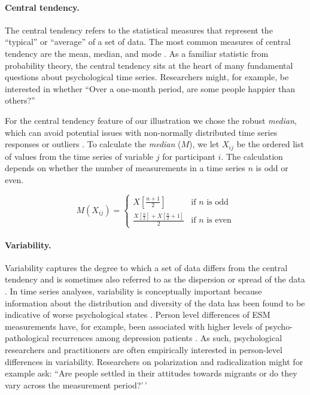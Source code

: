 \paragraph{Central tendency.}

The central tendency refers to the statistical measures that represent
the ``typical'' or ``average'' of a set of data. The most common
measures of central tendency are the mean, median, and mode
\citep{weisberg1992}. As a familiar statistic from probability theory,
the central tendency sits at the heart of many fundamental questions
about psychological time series. Researchers might, for example, be
interested in whether ``Over a one-month period, are some people happier
than others?''

For the central tendency feature of our illustration we chose the robust
\textit{median}, which can avoid potential issues with non-normally
distributed time series responses or outliers \citep{weisberg1992}. To
calculate the \textit{median} (\(M\)), we let \(X_{ij}\) be the ordered
list of values from the time series of variable \(j\) for participant
\(i\). The calculation depends on whether the number of measurements in
a time series \(n\) is odd or even.

\begin{equation} \label{eq:median}
  M(X_{ij}) = 
    \begin{cases}
      X \left[ \frac{n+1}{2} \right] & \text{if $n$ is odd} \\
      \frac{X \left[ \frac{n}{2} \right] + X \left[ \frac{n}{2} +1 \right]}{2} & \text{if $n$ is even}
    \end{cases}
\end{equation}

\paragraph{Variability.}

Variability captures the degree to which a set of data differs from the
central tendency and is sometimes also referred to as the dispersion or
spread of the data \citep{weisberg1992}. In time series analyses,
variability is conceptually important because information about the
distribution and diversity of the data has been found to be indicative
of worse psychological states \citep{myin-germeys2018, helmich2021}.
Person level differences of ESM measurements have, for example, been
associated with higher levels of psycho-pathological recurrences among
depression patients \citep{timm2017}. As such, psychological researchers
and practitioners are often empirically interested in person-level
differences in variability. Researchers on polarization and
radicalization might for example ask: ``Are people settled in their
attitudes towards migrants or do they vary across the measurement
period?'\,'

